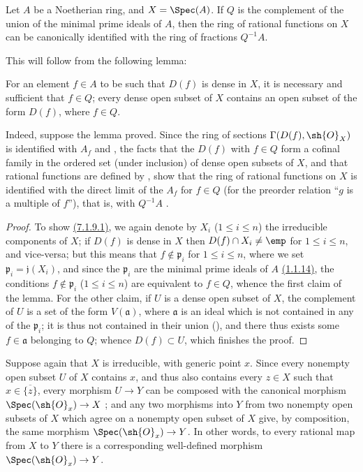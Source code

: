 \begin{corollary}[7.1.9]
\label{I.7.1.9}
Let $A$ be a Noetherian ring, and $X=\Spec(A)$.
If $Q$ is the complement of the union of the minimal prime ideals of $A$, then the ring of rational functions on $X$ can be canonically identified with the ring of fractions $Q^{-1}A$.
\end{corollary}

This will follow from the following lemma:
\begin{lemma}[7.1.9.1]
\label{I.7.1.9.1}
For an element $f\in A$ to be such that $D(f)$ is dense in $X$, it is necessary and sufficient that $f\in Q$; every dense open subset of $X$ contains an open subset of the form $D(f)$, where $f\in Q$.
\end{lemma}

Indeed, suppose the lemma proved. Since the ring of sections $\Gamma(D(f),\sh{O}_X)$ is identified with $A_f$  and , the facts that the $D(f)$ with $f\in Q$ form a cofinal family in the ordered set (under inclusion) of dense open subsets of $X$, and that rational functions are defined by , show that the ring of rational functions on $X$ is identified with the direct limit of the $A_f$ for $f\in Q$ (for the preorder relation ``$g$ is a multiple of $f$''), that is, with $Q^{-1}A$ .

\begin{proof}
To show \hyperref[I.7.1.9.1]{(7.1.9.1)}, we again denote by $X_i$ ($1\leq i\leq n$) the irreducible components of $X$; if $D(f)$ is dense in $X$ then $D(f)\cap X_i\neq\emp$ for $1\leq i\leq n$, and vice-versa; but this means that $f\not\in\mathfrak{p}_i$ for $1\leq i\leq n$, where we set $\mathfrak{p}_i=\mathfrak{j}(X_i)$, and since the $\mathfrak{p}_i$ are the minimal prime ideals of $A$ \hyperref[I.1.1.14]{(1.1.14)}, the conditions $f\not\in\mathfrak{p}_i$ ($1\leq i\leq n$) are equivalent to $f\in Q$, whence the first claim of the lemma.
For the other claim, if $U$ is a dense open subset of $X$, the complement of $U$ is a set of the form $V(\mathfrak{a})$, where $\mathfrak{a}$ is an ideal which is not contained in any of the $\mathfrak{p}_i$; it is thus not contained in their union (\cite[p.~13]{I-10}), and there thus exists some $f\in\mathfrak{a}$ belonging to $Q$; whence $D(f)\subset U$, which finishes the proof.
\end{proof}

\begin{env}[7.1.10]
\label{I.7.1.10}
Suppose again that $X$ is irreducible, with generic point $x$.
Since every nonempty open subset $U$ of $X$ contains $x$, and thus also contains every $z\in X$ such that $x\in\overline{\{z\}}$, every morphism $U\to Y$ can be composed with the canonical morphism $\Spec(\sh{O}_x)\to X$ ; and any two morphisms into $Y$ from two nonempty open subsets of $X$ which agree on a nonempty open subset of $X$ give, by composition, the same morphism $\Spec(\sh{O}_x)\to Y$.
In other words, to every rational map from $X$ to $Y$ there is a corresponding well-defined morphism $\Spec(\sh{O}_x)\to Y$.
\end{env}

